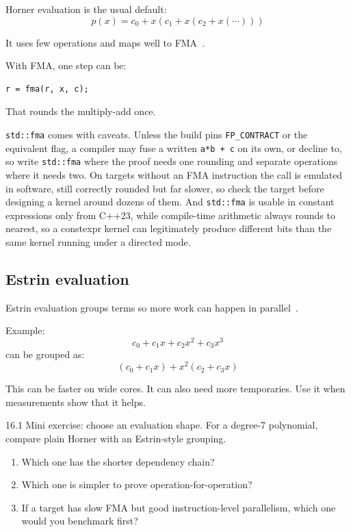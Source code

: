 \documentclass[manuscript, nonacm]{acmart}
\begin{document}
    Horner evaluation is the usual default:
    \[ p(x) = c_0 + x(c_1 + x(c_2 + x(\cdots))) \]

    It uses few operations and maps well to FMA~\cite{muller,handbook}.

    With FMA, one step can be:
    \begin{lstlisting}[style=cpp]
r = fma(r, x, c);
    \end{lstlisting}

    That rounds the multiply-add once.

    \texttt{std::fma} comes with caveats. Unless the build pins
    \texttt{FP\_CONTRACT} or the equivalent flag, a compiler may fuse a
    written \texttt{a*b + c} on its own, or decline to, so write
    \texttt{std::fma} where the proof needs one rounding and separate
    operations where it needs two. On targets without an FMA instruction
    the call is emulated in software, still correctly rounded but far
    slower, so check the target before designing a kernel around dozens of
    them. And \texttt{std::fma} is usable in constant expressions only
    from C++23, while compile-time arithmetic always rounds to nearest, so
    a constexpr kernel can legitimately produce different bits than the
    same kernel running under a directed mode.

    \subsection{Estrin evaluation}

    Estrin evaluation groups terms so more work can happen in
    parallel~\cite{handbook}.

    Example:
    \[ c_0 + c_1 x + c_2 x^2 + c_3 x^3 \]
    can be grouped as:
    \[ (c_0 + c_1 x) + x^2(c_2 + c_3 x) \]

    This can be faster on wide cores. It can also need more temporaries. Use it
    when measurements show that it helps.


    \begin{checkpoint}{16.1}
        Mini exercise: choose an evaluation shape. For a degree-7 polynomial,
        compare plain Horner with an Estrin-style grouping.
        \begin{enumerate}
            \item Which one has the shorter dependency chain?
            \item Which one is simpler to prove operation-for-operation?
            \item If a target has slow FMA but good instruction-level parallelism,
            which one would you benchmark first?
        \end{enumerate}
    \end{checkpoint}
\end{document}
